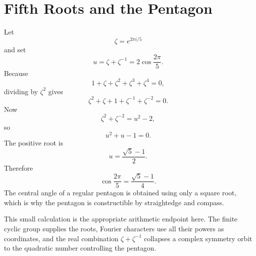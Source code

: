 \section{Fifth Roots and the Pentagon}

Let
\[
  \zeta=e^{2\pi i/5}
\]
and set
\[
  u=\zeta+\zeta^{-1}
  =2\cos\frac{2\pi}{5}.
\]
Because
\[
  1+\zeta+\zeta^2+\zeta^3+\zeta^4=0,
\]
dividing by \(\zeta^2\) gives
\[
  \zeta^2+\zeta+1+\zeta^{-1}+\zeta^{-2}=0.
\]
Now
\[
  \zeta^2+\zeta^{-2}=u^2-2,
\]
so
\[
  u^2+u-1=0.
\]
The positive root is
\[
  u=\frac{\sqrt5-1}{2}.
\]
Therefore
\[
  \cos\frac{2\pi}{5}
  =\frac{\sqrt5-1}{4}.
\]
The central angle of a regular pentagon is obtained using only a square root, which is why the pentagon is constructible by straightedge and compass.

This small calculation is the appropriate arithmetic endpoint here.  The finite cyclic group supplies the roots, Fourier characters use all their powers as coordinates, and the real combination \(\zeta+\zeta^{-1}\) collapses a complex symmetry orbit to the quadratic number controlling the pentagon.